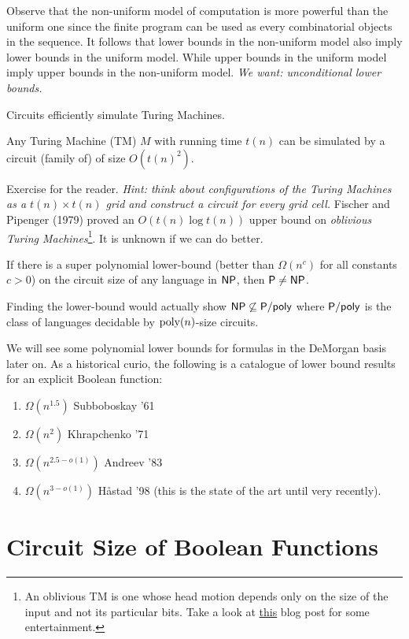 \documentclass[11pt]{article}
\begin{document}
Observe that the non-uniform model of computation is more powerful than the uniform one since the finite program can be used as every combinatorial objects in the sequence. It follows that lower bounds in the non-uniform model also imply lower bounds in the uniform model. While upper bounds in the uniform model imply upper bounds in the non-uniform model. \emph{We want: unconditional lower bounds.} 

Circuits efficiently simulate Turing Machines. 
\begin{lemma}
	Any Turing Machine (TM) $M$ with running time $t(n)$ can be simulated by a circuit (family of) of size $O\left(t(n)^2\right)$.
\end{lemma}
Exercise for the reader. \emph{Hint: think about configurations of the Turing Machines as a $t(n) \times t(n)$ grid and construct a circuit for every grid cell.} Fischer and Pipenger (1979) proved an $O(t(n)\log t(n))$ upper bound on \emph{oblivious Turing Machines}\footnote{An oblivious TM is one whose head motion depends only on the size of the input and not its particular bits. Take a look at \href{https://rjlipton.wordpress.com/2009/07/28/oblivious-turing-machines-and-a-crock/}{this} blog post for some entertainment.}. It is unknown if we can do better. 

\begin{corollary}
	If there is a super polynomial lower-bound (better than $\Omega(n^c)$ for all constants $c > 0$) on the circuit size of any language in $\mathsf{NP}$, then $\mathsf{P} \neq \mathsf{NP}$. 
\end{corollary}
Finding the lower-bound would actually show $\mathsf{NP} \not\subseteq \mathsf{P/poly}$ where $\mathsf{P/poly}$ is the class of languages decidable by $\operatorname*{poly}(n)$-size circuits.

We will see some polynomial lower bounds for formulas in the DeMorgan basis later on. As a historical curio, the following is a catalogue of lower bound results for an explicit Boolean function:
\begin{enumerate}
	\item $\Omega(n^{1.5})$ Subboboskay '61
	\item $\Omega(n^{2})$ Khrapchenko '71
	\item $\Omega(n^{2.5 - o(1)})$ Andreev '83
	\item $\Omega(n^{3 - o(1)})$ H\aa stad '98 (this is the state of the art until very recently). 
\end{enumerate}

\section{Circuit Size of Boolean Functions}
\label{sec:circuitsize}
\end{document}
